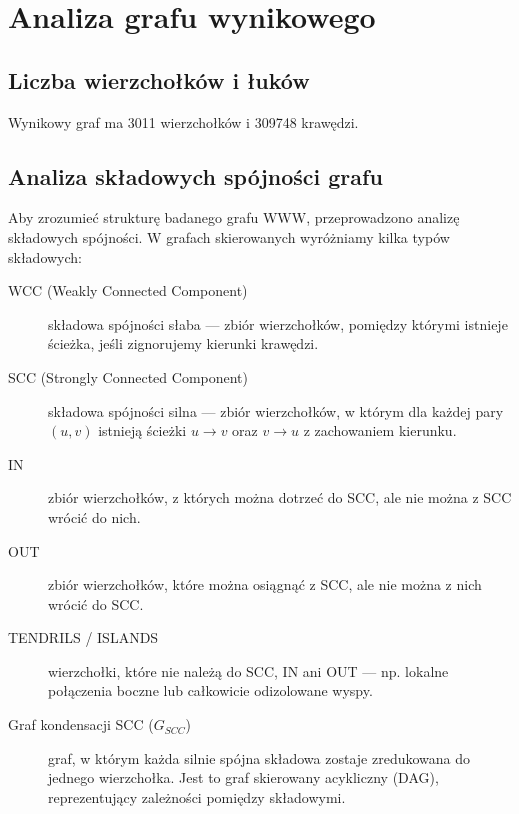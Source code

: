 \chapter{Analiza grafu wynikowego}

\section{Liczba wierzchołków i łuków}

Wynikowy graf ma 3011 wierzchołków i 309748 krawędzi.

\section{Analiza składowych spójności grafu}

Aby zrozumieć strukturę badanego grafu WWW, przeprowadzono analizę składowych spójności. W grafach skierowanych wyróżniamy kilka typów składowych:

\begin{description}
    \item[WCC (Weakly Connected Component)] składowa spójności słaba — zbiór wierzchołków, pomiędzy którymi istnieje ścieżka, jeśli zignorujemy kierunki krawędzi.
    
    \item[SCC (Strongly Connected Component)] składowa spójności silna — zbiór wierzchołków, w którym dla każdej pary $(u,v)$ istnieją ścieżki $u \rightarrow v$ oraz $v \rightarrow u$ z zachowaniem kierunku.
    
    \item[IN] zbiór wierzchołków, z których można dotrzeć do SCC, ale nie można z SCC wrócić do nich.
    
    \item[OUT] zbiór wierzchołków, które można osiągnąć z SCC, ale nie można z nich wrócić do SCC.
    
    \item[TENDRILS / ISLANDS] wierzchołki, które nie należą do SCC, IN ani OUT — np. lokalne połączenia boczne lub całkowicie odizolowane wyspy.
    
    \item[Graf kondensacji SCC ($G_{SCC}$)] graf, w którym każda silnie spójna składowa zostaje zredukowana do jednego wierzchołka. Jest to graf skierowany acykliczny (DAG), reprezentujący zależności pomiędzy składowymi.
\end{description}

